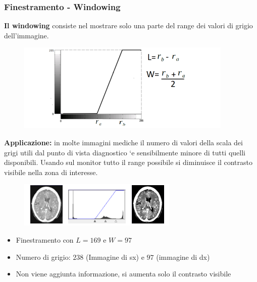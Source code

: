 \subsubsection{Finestramento - Windowing}

\begin{definition}
    \textbf{Il windowing} consiste nel mostrare solo una parte del range dei valori di grigio dell’immagine.
\end{definition}

\begin{figure}[H]
    \centering
    \includegraphics[width=\linewidth, keepaspectratio]{capitoli/immagini/imgs/win1.png}
\end{figure}

\textbf{Applicazione:} in molte immagini mediche il numero di valori della
scala dei grigi utili dal punto di vista diagnostico `e sensibilmente
minore di tutti quelli disponibili. Usando sul monitor tutto il range
possibile si diminuisce il contrasto visibile nella zona di interesse.

\begin{figure}[H]
    \centering
    \includegraphics[width=\linewidth, keepaspectratio]{capitoli/immagini/imgs/windowing.png}
\end{figure}

\begin{itemize}
    \item Finestramento con $L = 169$ e $W = 97$
    \item Numero di grigio: $238$ (Immagine di sx) e $97$ (immagine di dx)
    \item Non viene aggiunta informazione, si aumenta solo il contrasto visibile
\end{itemize}


